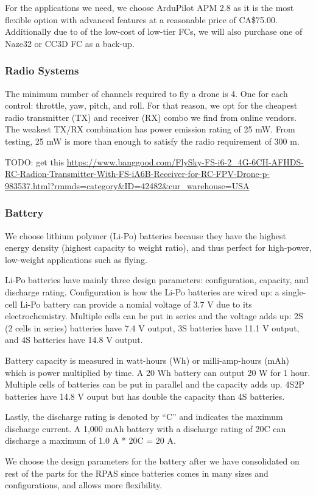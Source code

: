 For the applications we need, we choose ArduPilot APM 2.8 as it is the most flexible option with advanced features at a reasonable price of CA\$75.00. Additionally due to of the low-cost of low-tier FCs, we will also purchase one of Naze32 or CC3D FC as a back-up.

\subsubsection{Radio Systems}

The minimum number of channels required to fly a drone is 4. One for each control: throttle, yaw, 
pitch, and roll. For that reason, we opt for the cheapest radio transmitter (TX) and receiver  (RX) 
combo we find from online vendors. The weakest TX/RX combination has power emission rating of 25 mW. 
From testing, 25 mW is more than enough to satisfy the radio requirement of 300 m.

TODO: get this \url{https://www.banggood.com/FlySky-FS-i6-2_4G-6CH-AFHDS-RC-Radion-Transmitter-With-FS-iA6B-Receiver-for-RC-FPV-Drone-p-983537.html?rmmds=category&ID=42482&cur_warehouse=USA}

\subsubsection{Battery}

We choose lithium polymer (Li-Po) batteries because they have the highest energy density (highest 
capacity to weight ratio), and thus perfect for high-power, low-weight applications such as flying. 

Li-Po batteries have mainly three design parameters: configuration, capacity, and discharge rating. 
Configuration is how the Li-Po batteries are wired up: a single-cell Li-Po battery can provide a 
nomial voltage of 3.7 V due to its electrochemistry. Multiple cells can be put in series and the 
voltage adds up: 2S (2 cells in series) batteries have 7.4 V output, 3S batteries have 11.1 V output,
 and 4S batteries have 14.8 V output.

Battery capacity is measured in watt-hours (Wh) or milli-amp-hours (mAh) which is power multiplied by time. A 20 Wh battery can output 20 W for 1 hour. Multiple cells of batteries can be put in parallel and the capacity adds up. 4S2P batteries have 14.8 V ouput but has double the capacity than 4S batteries.

Lastly, the discharge rating is denoted by “C” and indicates the maximum discharge current. A 1,000 
mAh battery with a discharge rating of 20C can discharge a maximum of 1.0 A * 20C = 20 A.

We choose the design parameters for the battery after we have consolidated on rest of the parts for the RPAS since batteries comes in many sizes and configurations, and allows more flexibility.
